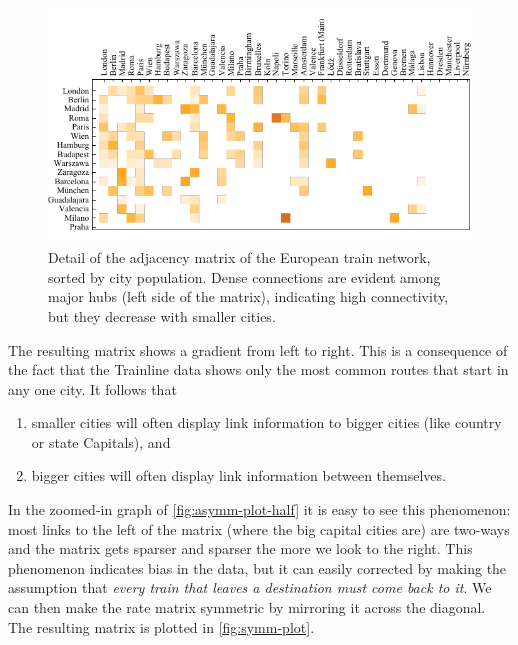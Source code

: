 \begin{figure}[h]
    \centering
    \includegraphics[width=\linewidth]{assets/asymmPlotHalf.pdf}
    \caption{
    Detail of the adjacency matrix of the European train network, sorted by city population. Dense connections are evident among major hubs (left side of the matrix), indicating high connectivity, but they decrease with smaller cities.}
    \label{fig:asymm-plot-half}
\end{figure}

The resulting matrix shows a gradient from left to right. This is a consequence of the fact that the Trainline data shows only the most common routes that start in any one city. It follows that
\begin{enumerate}
    \item smaller cities will often display link information to bigger cities (like country or state Capitals), and
    \item bigger cities will often display link information between themselves.
\end{enumerate}
In the zoomed-in graph of \autoref{fig:asymm-plot-half} it is easy to see this phenomenon: most links to the left of the matrix (where the big capital cities are) are two-ways and the matrix gets sparser and sparser the more we look to the right. 
This phenomenon indicates bias in the data, but it can easily corrected by making the assumption that \emph{every train that leaves a destination must come back to it}. We can then make the rate matrix symmetric by mirroring it across the diagonal\footnotemark. The resulting matrix is plotted in \autoref{fig:symm-plot}. 


